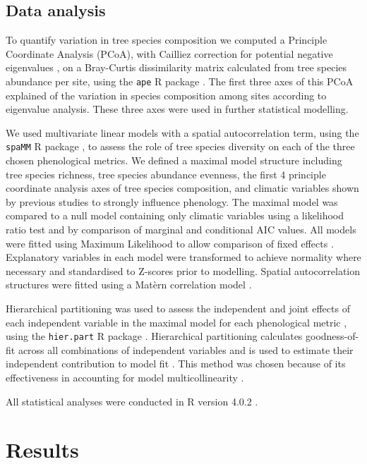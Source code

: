 \documentclass[11pt,a4paper]{article}
\begin{document}
\subsection{Data analysis}

To quantify variation in tree species composition we computed a Principle Coordinate Analysis (PCoA), with Cailliez correction for potential negative eigenvalues \citep{Legendre1998}, on a Bray-Curtis dissimilarity matrix calculated from tree species abundance per site, using the \texttt{ape} R package \citep{ape2019}. The first three axes of this PCoA explained \pcoaPer{} of the variation in species composition among sites according to eigenvalue analysis. These three axes were used in further statistical modelling.

We used multivariate linear models with a spatial autocorrelation term, using the \texttt{spaMM} R package \citep{spaMM2014}, to assess the role of tree species diversity on each of the three chosen phenological metrics. We defined a maximal model structure including tree species richness, tree species abundance evenness, the first 4 principle coordinate analysis axes of tree species composition, and climatic variables shown by previous studies to strongly influence phenology. The maximal model was compared to a null model containing only climatic variables using a likelihood ratio test and by comparison of marginal and conditional AIC values. All models were fitted using Maximum Likelihood to allow comparison of fixed effects \citep{}. Explanatory variables in each model were transformed to achieve normality where necessary and standardised to Z-scores prior to modelling. Spatial autocorrelation structures were fitted using a Mat\`{e}rn correlation model \citep{}.

Hierarchical partitioning was used to assess the independent and joint effects of each independent variable in the maximal model for each phenological metric \citep{Chevan1991, MacNally2002}, using the \texttt{hier.part} R package \citep{hier.part2004}. Hierarchical partitioning calculates goodness-of-fit across all combinations of independent variables \citep{Walsh2013} and is used to estimate their independent contribution to model fit \citep{MacNally2002}. This method was chosen because of its effectiveness in accounting for model multicollinearity \citep{Olea2010}. 

All statistical analyses were conducted in R version 4.0.2 \citep{R2020}.

\section{Results}
\end{document}
